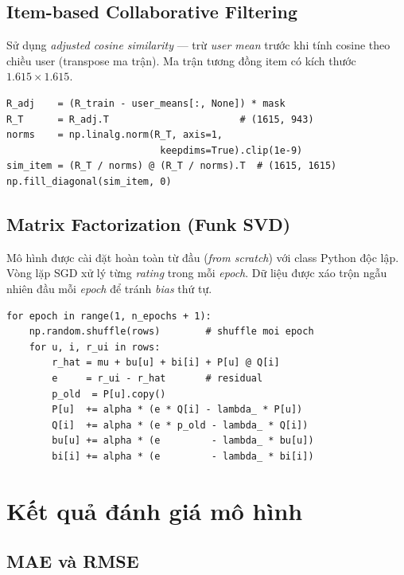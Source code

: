 ﻿\documentclass[../BTL.tex]{subfiles}
\begin{document}
\subsection{Item-based Collaborative Filtering}
\label{section:3.6.2}

Sử dụng \textit{adjusted cosine similarity} — trừ \textit{user mean} trước
khi tính cosine theo chiều user (transpose ma trận). Ma trận tương đồng item
có kích thước $1.615 \times 1.615$.

\begin{lstlisting}[style=python, caption={\textit{Adjusted cosine
similarity} cho Item-based CF}]
R_adj    = (R_train - user_means[:, None]) * mask
R_T      = R_adj.T                       # (1615, 943)
norms    = np.linalg.norm(R_T, axis=1,
                           keepdims=True).clip(1e-9)
sim_item = (R_T / norms) @ (R_T / norms).T  # (1615, 1615)
np.fill_diagonal(sim_item, 0)
\end{lstlisting}

\subsection{Matrix Factorization (Funk SVD)}
\label{section:3.6.3}

Mô hình được cài đặt hoàn toàn từ đầu (\textit{from scratch}) với class
Python độc lập. Vòng lặp SGD xử lý từng \textit{rating} trong mỗi
\textit{epoch}. Dữ liệu được xáo trộn ngẫu nhiên đầu mỗi \textit{epoch} để
tránh \textit{bias} thứ tự.

\begin{lstlisting}[style=python, caption={Vòng lặp SGD cho Matrix
Factorization (Funk SVD)}]
for epoch in range(1, n_epochs + 1):
    np.random.shuffle(rows)        # shuffle moi epoch
    for u, i, r_ui in rows:
        r_hat = mu + bu[u] + bi[i] + P[u] @ Q[i]
        e     = r_ui - r_hat       # residual
        p_old  = P[u].copy()
        P[u]  += alpha * (e * Q[i] - lambda_ * P[u])
        Q[i]  += alpha * (e * p_old - lambda_ * Q[i])
        bu[u] += alpha * (e         - lambda_ * bu[u])
        bi[i] += alpha * (e         - lambda_ * bi[i])
\end{lstlisting}

\section{Kết quả đánh giá mô hình}
\label{section:3.7}

\subsection{MAE và RMSE}
\label{section:3.7.1}
\end{document}
